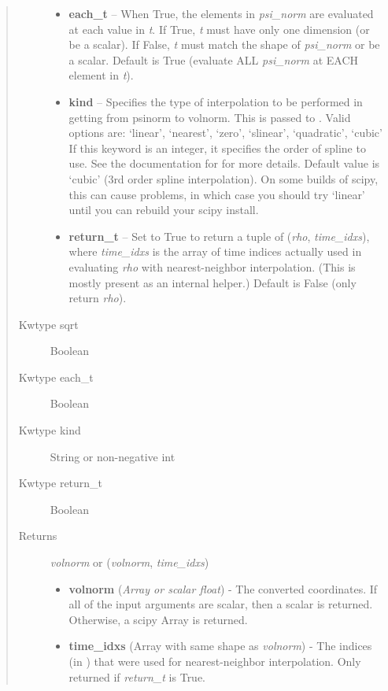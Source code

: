 \documentclass[letterpaper,10pt,english]{sphinxmanual}
\begin{document}
\begin{fulllineitems}
\begin{fulllineitems}
\begin{quote}
\begin{description}
\begin{itemize}
\item {} 
\textbf{each\_t} -- When True, the elements in \emph{psi\_norm} are evaluated at
each value in \emph{t}. If True, \emph{t} must have only one dimension (or
be a scalar). If False, \emph{t} must match the shape of \emph{psi\_norm} or be
a scalar. Default is True (evaluate ALL \emph{psi\_norm} at EACH element in
\emph{t}).

\item {} 
\textbf{kind} -- Specifies the type of
interpolation to be performed in getting from psinorm to
volnorm. This is passed to
. Valid options are:
`linear', `nearest', `zero', `slinear', `quadratic', `cubic'
If this keyword is an integer, it specifies the order of spline
to use. See the documentation for  for more
details. Default value is `cubic' (3rd order spline
interpolation). On some builds of scipy, this can cause problems,
in which case you should try `linear' until you can rebuild your
scipy install.

\item {} 
\textbf{return\_t} -- Set to True to return a tuple of (\emph{rho},
\emph{time\_idxs}), where \emph{time\_idxs} is the array of time indices
actually used in evaluating \emph{rho} with nearest-neighbor
interpolation. (This is mostly present as an internal helper.)
Default is False (only return \emph{rho}).

\end{itemize}

\item[{Kwtype sqrt}] \leavevmode
Boolean

\item[{Kwtype each\_t}] \leavevmode
Boolean

\item[{Kwtype kind}] \leavevmode
String or non-negative int

\item[{Kwtype return\_t}] \leavevmode
Boolean

\item[{Returns}] \leavevmode

\emph{volnorm} or (\emph{volnorm}, \emph{time\_idxs})
\begin{itemize}
\item {} 
\textbf{volnorm} (\emph{Array or scalar float}) - The converted coordinates. If
all of the input arguments are scalar, then a scalar is returned.
Otherwise, a scipy Array is returned.

\item {} 
\textbf{time\_idxs} (Array with same shape as \emph{volnorm}) - The indices
(in ) that were used for
nearest-neighbor interpolation. Only returned if \emph{return\_t} is
True.


\end{itemize}
\end{description}
\end{quote}
\end{fulllineitems}
\end{fulllineitems}
\end{document}
